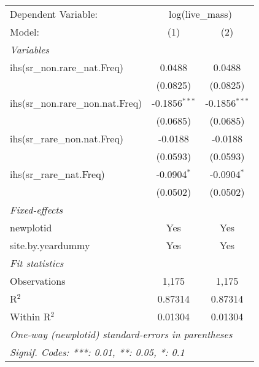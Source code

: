 \begin{tabular}{lcc}
\tabularnewline\midrule\midrule
Dependent Variable:&\multicolumn{2}{c}{log(live\_mass)}\\
Model:&(1) & (2)\\
\midrule \emph{Variables}&   &  \\
ihs(sr\_non.rare\_nat.Freq)&0.0488 & 0.0488\\
  &(0.0825) & (0.0825)\\
ihs(sr\_non.rare\_non.nat.Freq)&-0.1856$^{***}$ & -0.1856$^{***}$\\
  &(0.0685) & (0.0685)\\
ihs(sr\_rare\_non.nat.Freq)&-0.0188 & -0.0188\\
  &(0.0593) & (0.0593)\\
ihs(sr\_rare\_nat.Freq)&-0.0904$^{*}$ & -0.0904$^{*}$\\
  &(0.0502) & (0.0502)\\
\midrule \emph{Fixed-effects}&   &  \\
newplotid & Yes & Yes\\
site.by.yeardummy & Yes & Yes\\
\midrule \emph{Fit statistics}&  & \\
Observations & 1,175&1,175\\
R$^2$ & 0.87314&0.87314\\
Within R$^2$ & 0.01304&0.01304\\
\midrule\midrule\multicolumn{3}{l}{\emph{One-way (newplotid) standard-errors in parentheses}}\\
\multicolumn{3}{l}{\emph{Signif. Codes: ***: 0.01, **: 0.05, *: 0.1}}\\
\end{tabular}


